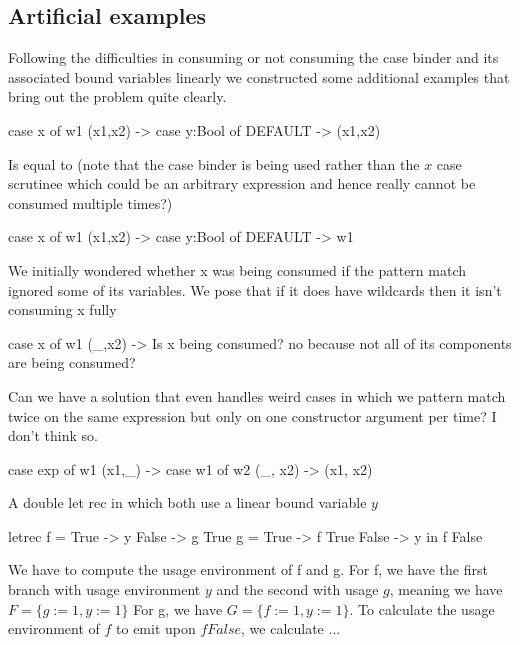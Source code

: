 \documentclass[a4paper, draft]{report}
\begin{document}


\subsection{Artificial examples}

Following the difficulties in consuming or not consuming the case binder and its
associated bound variables linearly we constructed some additional examples that
bring out the problem quite clearly.
\begin{code}
case x of w1
    (x1,x2) -> case y:Bool of
                DEFAULT -> (x1,x2)
\end{code}
Is equal to (note that the case binder is being used rather than the $x$ case
scrutinee which could be an arbitrary expression and hence really cannot be
consumed multiple times?)
\begin{code}
case x of w1
    (x1,x2) -> case y:Bool of
                DEFAULT -> w1
\end{code}

We initially wondered whether x was being consumed if the pattern match ignored
some of its variables. We pose that if it does have wildcards then it isn't
consuming x fully
\begin{code}
case x of w1
    (_,x2) -> Is x being consumed? no because not all of its components are
    being consumed?
\end{code}

Can we have a solution that even handles weird cases in which we pattern match
twice on the same expression but only on one constructor argument per time? I
don't think so.
\begin{code}
case exp of w1
    (x1,_) -> case w1 of w2
                (_, x2) -> (x1, x2)
\end{code}

A double let rec in which both use a linear bound variable $y$
\begin{code}
letrec f = \case
        True  -> y
        False -> g True
       g = \case
        True -> f True
        False -> y
    in f False
\end{code}

We have to compute the usage environment of f and g.
For f, we have the first branch with usage environment $y$ and the second with
usage $g$, meaning we have $F = \{g := 1, y := 1\}$
For g, we have $G = \{f := 1, y := 1\}$. To calculate the usage environment of
$f$ to emit upon $f False$, we calculate ...
\end{document}
